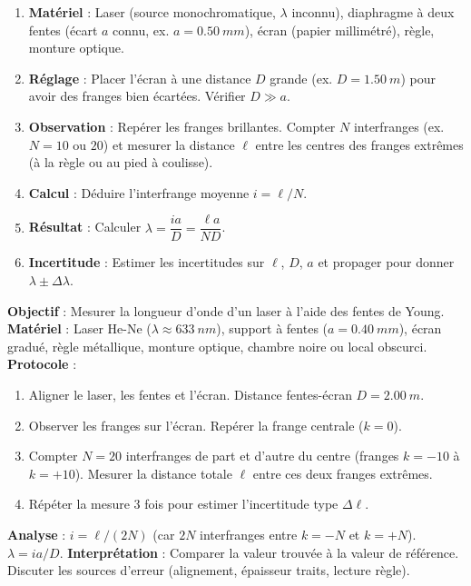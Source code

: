 \documentclass[11pt]{article}
\begin{document}
\begin{methode}
\begin{enumerate}
\item \textbf{Matériel} : Laser (source monochromatique, $\lambda$ inconnu), diaphragme à deux fentes (écart $a$ connu, ex. $a = \SI{0,50}{mm}$), écran (papier millimétré), règle, monture optique.
\item \textbf{Réglage} : Placer l'écran à une distance $D$ grande (ex. $D = \SI{1,50}{m}$) pour avoir des franges bien écartées. Vérifier $D \gg a$.
\item \textbf{Observation} : Repérer les franges brillantes. Compter $N$ interfranges (ex. $N = 10$ ou $20$) et mesurer la distance $\ell$ entre les centres des franges extrêmes (à la règle ou au pied à coulisse).
\item \textbf{Calcul} : Déduire l'interfrange moyenne $i = \ell / N$.
\item \textbf{Résultat} : Calculer $\lambda = \dfrac{i a}{D} = \dfrac{\ell a}{N D}$.
\item \textbf{Incertitude} : Estimer les incertitudes sur $\ell$, $D$, $a$ et propager pour donner $\lambda \pm \Delta\lambda$.
\end{enumerate}
\end{methode}

\begin{experience}
\textbf{Objectif} : Mesurer la longueur d'onde d'un laser à l'aide des fentes de Young.
\textbf{Matériel} : Laser He-Ne ($\lambda \approx \SI{633}{nm}$), support à fentes ($a = \SI{0,40}{mm}$), écran gradué, règle métallique, monture optique, chambre noire ou local obscurci.
\textbf{Protocole} :
\begin{enumerate}
\item Aligner le laser, les fentes et l'écran. Distance fentes-écran $D = \SI{2,00}{m}$.
\item Observer les franges sur l'écran. Repérer la frange centrale ($k=0$).
\item Compter $N = 20$ interfranges de part et d'autre du centre (franges $k=-10$ à $k=+10$). Mesurer la distance totale $\ell$ entre ces deux franges extrêmes.
\item Répéter la mesure 3 fois pour estimer l'incertitude type $\Delta\ell$.
\end{enumerate}
\textbf{Analyse} : $i = \ell / (2N)$ (car $2N$ interfranges entre $k=-N$ et $k=+N$). $\lambda = i a / D$.
\textbf{Interprétation} : Comparer la valeur trouvée à la valeur de référence. Discuter les sources d'erreur (alignement, épaisseur traits, lecture règle).
\end{experience}
\end{document}
